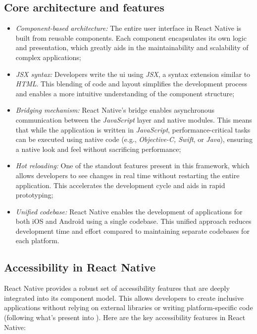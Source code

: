 \subsection{Core architecture and features}
\begin{itemize}
    \item \textit{Component-based architecture:}  
    The entire user interface in React Native is built from reusable components. Each component encapsulates its own logic and presentation, which greatly aids in the maintainability and scalability of complex applications;
    
    \item \textit{JSX syntax:}  
    Developers write the \acrshort{ui} using \textit{JSX}, a syntax extension similar to \textit{HTML}. This blending of code and layout simplifies the development process and enables a more intuitive understanding of the component structure;
    
    \item \textit{Bridging mechanism:}  
    React Native’s bridge enables asynchronous communication between the \textit{JavaScript} layer and native modules. This means that while the application is written in \textit{JavaScript}, performance-critical tasks can be executed using native code (e.g., \textit{Objective-C, Swift}, or \textit{Java}), ensuring a native look and feel without sacrificing performance;
    
    \item \textit{Hot reloading:}  
    One of the standout features present in this framework, which allows developers to see changes in real time without restarting the entire application. This accelerates the development cycle and aids in rapid prototyping;
    
    \item \textit{Unified codebase:}  
    React Native enables the development of applications for both iOS and Android using a single codebase. This unified approach reduces development time and effort compared to maintaining separate codebases for each platform.
\end{itemize}

\subsection{Accessibility in React Native}
React Native provides a robust set of accessibility features that are deeply integrated into its component model. This allows developers to create inclusive applications without relying on external libraries or writing platform-specific code (following what's present into \cite{site:reactnativeaccess}). Here are the key accessibility features in React Native:

